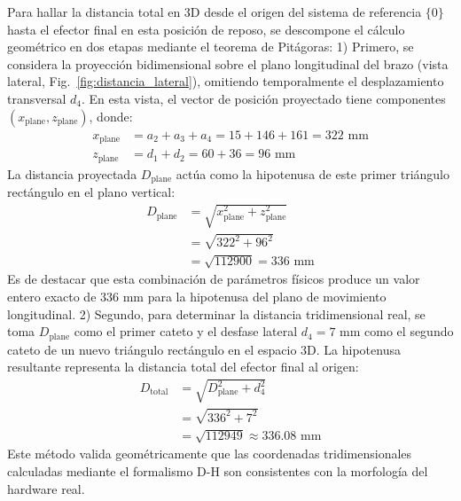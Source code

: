 \documentclass[conference,a4paper]{IEEEtran}
\begin{document}
Para hallar la distancia total en 3D desde el origen del sistema de referencia $\{0\}$ hasta el efector final en esta posición de reposo, se descompone el cálculo geométrico en dos etapas mediante el teorema de Pitágoras:
1) Primero, se considera la proyección bidimensional sobre el plano longitudinal del brazo (vista lateral, Fig.~\ref{fig:distancia_lateral}), omitiendo temporalmente el desplazamiento transversal $d_4$. En esta vista, el vector de posición proyectado tiene componentes $(x_{\text{plane}}, z_{\text{plane}})$, donde:
\begin{align}
x_{\text{plane}} &= a_2 + a_3 + a_4 = 15 + 146 + 161 = 322\text{ mm} \\
z_{\text{plane}} &= d_1 + d_2 = 60 + 36 = 96\text{ mm}
\end{align}
La distancia proyectada $D_{\text{plane}}$ actúa como la hipotenusa de este primer triángulo rectángulo en el plano vertical:
\begin{equation}
\begin{split}
D_{\text{plane}} &= \sqrt{x_{\text{plane}}^2 + z_{\text{plane}}^2} \\
&= \sqrt{322^2 + 96^2} \\
&= \sqrt{112900} = 336\text{ mm}
\end{split}
\end{equation}
Es de destacar que esta combinación de parámetros físicos produce un valor entero exacto de $336\text{ mm}$ para la hipotenusa del plano de movimiento longitudinal.
2) Segundo, para determinar la distancia tridimensional real, se toma $D_{\text{plane}}$ como el primer cateto y el desfase lateral $d_4 = 7\text{ mm}$ como el segundo cateto de un nuevo triángulo rectángulo en el espacio 3D. La hipotenusa resultante representa la distancia total del efector final al origen:
\begin{equation}
\begin{split}
D_{\text{total}} &= \sqrt{D_{\text{plane}}^2 + d_4^2} \\
&= \sqrt{336^2 + 7^2} \\
&= \sqrt{112949} \approx 336.08\text{ mm}
\end{split}
\end{equation}
Este método valida geométricamente que las coordenadas tridimensionales calculadas mediante el formalismo D-H son consistentes con la morfología del hardware real.
\end{document}

